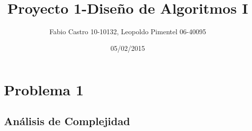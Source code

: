 \documentclass[a4paper,10pt]{article}
\title{}
\author{}
\date{}
\begin{document}
 
\title{\Huge Proyecto 1-Diseño de Algoritmos I}



\author{Fabio Castro 10-10132, Leopoldo Pimentel 06-40095} 



\date{05/02/2015}

\maketitle
\section{Problema 1}
\subsection{Análisis de Complejidad}
\end{document}

